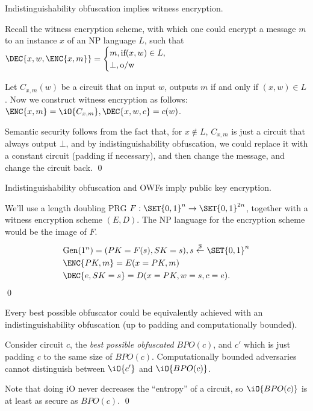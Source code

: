 \documentclass[12pt]{tufte-book}
\begin{document}
\begin{lemma}
	Indistinguishability obfuscation implies witness encryption.
\end{lemma}
\proof
Recall the witness encryption scheme, with which one could encrypt a message $m$ to an instance $x$ of an NP language $L$, such that $\DEC{x,w,\ENC{x,m}}=
\begin{cases}
	m, \hbox{if} (x,w)\in L, \\
	\bot, \hbox{o/w}
\end{cases}$

Let $C_{x,m}(w)$ be a circuit that on input $w$, outputs $m$ if and only if $(x,w) \in L$.
Now we construct witness encryption as follows:
$\ENC{x,m}=\iO{C_{x,m}}, \DEC{x,w,c}=c(w)$.

Semantic security follows from the fact that, for $x\not\in L$, $C_{x,m}$ is just a circuit that always output $\bot$, and by indistinguishability obfuscation, we could replace it with a constant circuit (padding if necessary), and then change the message, and change the circuit back.
\qed


\begin{lemma}
	Indistinguishability obfuscation and OWFs imply public key encryption.
\end{lemma}
\proof
We'll use a length doubling PRG $F: \SET{0,1}^n \to \SET{0,1}^{2n}$, together with a witness encryption scheme $(E,D)$.
The NP language for the encryption scheme would be the image of $F$.
\begin{align*}
	&\mathrm{Gen}(1^n) = (PK = F(s), SK=s), s\overset{\$}{\leftarrow} \SET{0,1}^n\\
	&\ENC{PK,m} = E(x=PK,m)\\
	&\DEC{e,SK=s} = D(x=PK,w=s,c=e).
\end{align*}
\qed

\begin{lemma}
	Every best possible obfuscator could be equivalently achieved with an indistinguishability obfuscation (up to padding and computationally bounded).
\end{lemma}

\proof
Consider circuit $c$, the \emph{best possible obfuscated} $BPO(c)$, and $c'$ which is just padding $c$ to the same size of $BPO(c)$.
Computationally bounded adversaries cannot distinguish between $\iO{c'}$ and $\iO{BPO(c)}$.

Note that doing iO never decreases the ``entropy'' of a circuit, so $\iO{BPO(c)}$ is at least as secure as $BPO(c)$.
\qed
\end{document}
